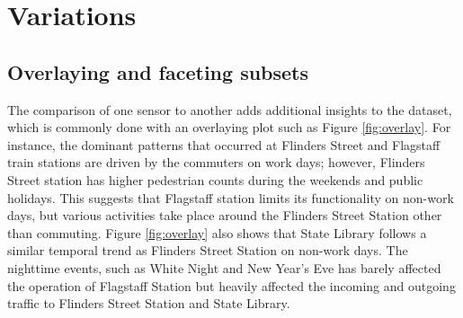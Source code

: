 \documentclass[article]{jss}
\theoremstyle{definition}
\theoremstyle{definition}
\theoremstyle{remark}
\begin{document}
\section{Variations}\label{variations}

\label{sec:examples}

\subsection{Overlaying and faceting
subsets}\label{overlaying-and-faceting-subsets}

The comparison of one sensor to another adds additional insights to the
dataset, which is commonly done with an overlaying plot such as Figure
\ref{fig:overlay}. For instance, the dominant patterns that occurred at
Flinders Street and Flagstaff train stations are driven by the commuters
on work days; however, Flinders Street station has higher pedestrian
counts during the weekends and public holidays. This suggests that
Flagstaff station limits its functionality on non-work days, but various
activities take place around the Flinders Street Station other than
commuting. Figure \ref{fig:overlay} also shows that State Library
follows a similar temporal trend as Flinders Street Station on non-work
days. The nighttime events, such as White Night and New Year's Eve has
barely affected the operation of Flagstaff Station but heavily affected
the incoming and outgoing traffic to Flinders Street Station and State
Library.
\end{document}
